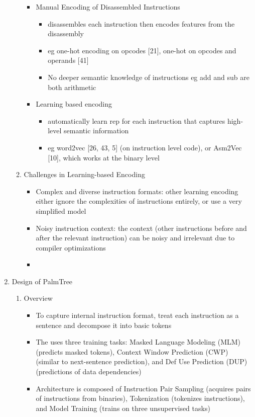 \documentclass{article}
\begin{document}
\begin{enumerate}
\begin{enumerate}
\begin{itemize}
			\item Manual Encoding of Disassembled Instructions
			\begin{itemize}
				\item disassembles each instruction then encodes features from the disassembly
				\item eg one-hot encoding on opcodes [21], one-hot on opcodes and operands [41]
				\item No deeper semantic knowledge of instructions eg add and sub are both arithmetic
			\end{itemize}
			\item Learning based encoding
			\begin{itemize}
				\item automatically learn rep for each instruction that captures high-level semantic information
				\item eg word2vec [26, 43, 5] (on instruction level code), or Asm2Vec [10], which works at the binary level
			\end{itemize}
		\end{itemize} 
		\item Challenges in Learning-based Encoding
		\begin{itemize}
			\item Complex and diverse instruction formats: other learning encoding either ignore the complexities of instructions entirely, or use a very simplified model
			\item Noisy instruction context: the context (other instructions before and after the relevant instruction) can be noisy and irrelevant due to compiler optimizations
			\item 
		\end{itemize}
	\end{enumerate}
	\item Design of PalmTree
	\begin{enumerate}
		\item Overview
		\begin{itemize}
			\item To capture internal instruction format, treat each instruction as a sentence and decompose it into basic tokens
			\item The uses three training tasks: Masked Language Modeling (MLM) (predicts masked tokens), Context Window Prediction (CWP) (similar to next-sentence prediction), and Def Use Prediction (DUP) (predictions of data dependencies)
			\item Architecture is composed of Instruction Pair Sampling (acquires pairs of instructions from binaries), Tokenization (tokenizes instructions), and Model Training (trains on three unsupervised tasks)

\end{itemize}
\end{enumerate}
\end{enumerate}
\end{document}
